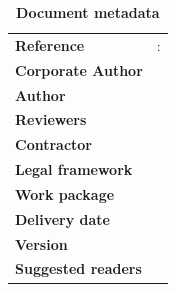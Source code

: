 \clearpage


\setlength{\headheight}{1cm}
\setlength{\footskip}{18mm}
\addtolength{\textheight}{-\footskip}
\pagestyle{empty}

\clearpage



\vspace*{\fill}  

\textbf{\footnotesize \DelPreparation}

\begin{flushleft}
\begin{table}[!b]
	 \caption*{\large\textbf{Document metadata}}
	 \footnotesize
	  \begin{tabular}{p{3.6cm}p{\textwidth-5cm}}
		\textbf{Reference} 	&   \DelNumber: \DelTitle \\	
		\textbf{Corporate Author}      &   \DelCorporateAuthor \\
		\textbf{Author}             &   \DelAuthor \\
		\textbf{Reviewers}          &   \DelReviewer \\
  		\textbf{Contractor}    &   \DelContractor \\
		\textbf{Legal framework}    & \DelLegalFramework   \\	
		\textbf{Work package}  &   \DelNumber\\    				
		\textbf{Delivery date}  &   \DelDate \\    
		\textbf{Version}     	&   \DelVersion \\
		\textbf{Suggested readers}    	&   \DelReaders \\
	\end{tabular}
\end{table}
\end{flushleft}



